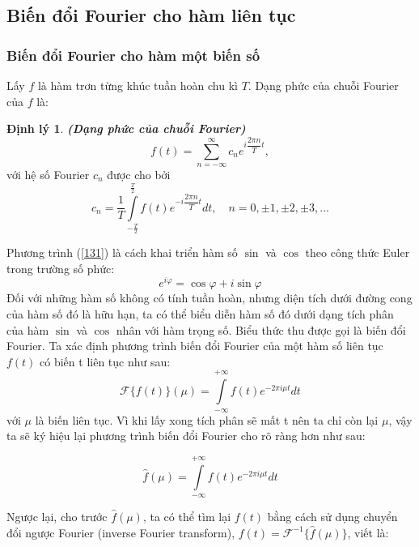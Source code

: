 \documentclass[12pt,a4paper]{report}
\numberwithin{equation}{section}
\theoremstyle{definition} %
\newtheorem{dl}{Định lý}[chapter]
\begin{document}
\subsection{Biến đổi Fourier cho hàm liên tục}
\subsubsection{Biến đổi Fourier cho hàm một biến số}
Lấy $f$ là hàm trơn từng khúc tuần hoàn chu kì $T$. Dạng phức của chuỗi Fourier của $f$ là: 
\begin{dl}	
\textbf{\textit{(Dạng phức của chuỗi Fourier)}}
\begin{equation}
	\label{131}
    f(t)= \sum_{n=-\infty} ^{\infty} c_ne^{i\dfrac{2\pi n}{T}t},
\end{equation}
với hệ số Fourier $c_n$ được cho bởi
\begin{equation}
	\label{132}
    c_n=\dfrac{1}{T}\displaystyle\int\limits_{-\frac{T}{2}}^{\frac{T}{2}} f(t)e^{-i\dfrac{2\pi n}{T}t}dt,\quad n=0,\pm 1,\pm 2, \pm 3,...
\end{equation}
\end{dl}
Phương trình (\ref{131}) là cách khai triển hàm số $\sin$ và $\cos$ theo công thức Euler trong trường số phức:
\begin{equation}
	\label{133}
    e^{i\varphi}=\cos\varphi+i \sin\varphi
\end{equation}
Đối với những hàm số không có tính tuần hoàn, nhưng diện tích dưới đường cong của hàm số đó là hữu hạn, ta có thể biểu diễn hàm số đó dưới dạng tích phân của hàm $\sin$ và $\cos$ nhân với hàm trọng số. Biểu thức thu được gọi là biến đổi Fourier.
Ta xác định phương trình biến đổi Fourier của một hàm số liên tục $f(t)$ có biến t liên tục như sau:
\begin{equation}
	\label{134}
    \mathcal{F}\{f(t)\}(\mu)=\int\limits_{-\infty}^{+\infty}f(t)e^{-2\pi i  \mu t}dt
\end{equation}
với $\mu$ là biến liên tục. Vì khi lấy xong tích phân sẽ mất t nên ta chỉ còn lại $\mu$, vậy ta sẽ ký hiệu lại phương trình biến đổi Fourier cho rõ ràng hơn như sau:

\begin{equation}
	\label{135}
  \hat{f}(\mu)=\int\limits_{-\infty}^{+\infty}f(t)e^{-2\pi i \mu t}dt
\end{equation}

Ngược lại, cho trước $\hat{f}(\mu)$, ta có thể tìm lại $f(t)$ bằng cách sử dụng chuyển đổi ngược Fourier (inverse Fourier transform), $f(t)=\mathcal{F}^{-1}\{\hat{f}(\mu)\}$, viết là:
\end{document}
